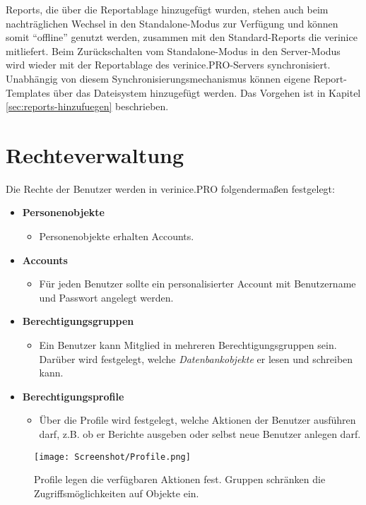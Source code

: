 \documentclass[a4paper,10pt]{book}
\begin{document}
Reports, die über die Reportablage hinzugefügt wurden, stehen auch
beim nachträglichen Wechsel in den Standalone-Modus zur Verfügung und
können somit ``offline'' genutzt werden, zusammen mit den
Standard-Reports die verinice mitliefert. Beim Zurückschalten vom
Standalone-Modus in den Server-Modus wird wieder mit der Reportablage
des verinice.PRO-Servers synchronisiert.\\

Unabhängig von diesem Synchronisierungs\-mechanismus können eigene
Report-Templates über das Dateisystem hinzugefügt werden. Das
Vorgehen ist in Kapitel \ref{sec:reports-hinzufuegen} beschrieben.

\section{Rechteverwaltung} \label{Rechteverwaltung}
Die Rechte der Benutzer werden in verinice.\textsc{PRO} folgendermaßen festgelegt:
\begin{itemize}
\item \textbf{Personenobjekte}
  \begin{itemize}
   \item Personenobjekte erhalten Accounts.
  \end{itemize}
\item \textbf{Accounts}
  \begin{itemize}
   \item Für jeden Benutzer sollte ein personalisierter Account mit Benutzername und Passwort angelegt werden.
  \end{itemize}
\item \textbf{Berechtigungsgruppen}
   \begin{itemize}
    \item Ein Benutzer kann Mitglied in mehreren Berechtigungsgruppen sein. Darüber wird festgelegt, welche \textit{Datenbankobjekte} er lesen und schreiben kann.
   \end{itemize}
\item \textbf{Berechtigungsprofile}
  \begin{itemize}
   \item Über die Profile wird festgelegt, welche Aktionen der Benutzer ausführen darf, z.B. ob er Berichte ausgeben oder selbst neue Benutzer anlegen darf.
  \end{itemize}
\end{itemize}
\begin{figure}[htb!]
  \centering
  \texttt{[image: Screenshot/Profile.png]}
  \caption{\label{Profile_Aktionen_Gruppen_Zugriffsmoeglichkeiten_auf_Objekte} Profile legen die verfügbaren Aktionen fest. Gruppen schränken die Zugriffsmöglichkeiten auf Objekte ein.}
\end{figure}
\end{document}
